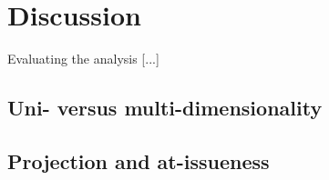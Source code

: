\section{Discussion}

Evaluating the analysis [...]

\subsection{Uni- versus multi-dimensionality}

\subsection{Projection and at-issueness}

\citet{simons2010projects}



